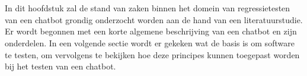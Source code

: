 \chapter{}
\label{ch:stand-van-zaken}





%

In dit hoofdstuk zal de stand van zaken binnen het domein van regressietesten van een chatbot grondig onderzocht worden aan de hand van een literatuurstudie. Er wordt begonnen met een korte algemene beschrijving van een chatbot en zijn onderdelen. In een volgende sectie wordt er gekeken wat de basis is om software te testen, om vervolgens te bekijken hoe deze principes kunnen toegepast worden bij het testen van een chatbot. 

